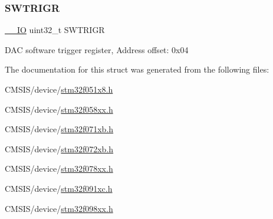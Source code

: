 \subsubsection{\texorpdfstring{S\+W\+T\+R\+I\+GR}{SWTRIGR}}
{\footnotesize\ttfamily \hyperlink{core__sc300_8h_aec43007d9998a0a0e01faede4133d6be}{\+\_\+\+\_\+\+IO} uint32\+\_\+t S\+W\+T\+R\+I\+GR}

D\+AC software trigger register, Address offset\+: 0x04 

The documentation for this struct was generated from the following files\+:\begin{DoxyCompactItemize}
\item 
C\+M\+S\+I\+S/device/\hyperlink{stm32f051x8_8h}{stm32f051x8.\+h}\item 
C\+M\+S\+I\+S/device/\hyperlink{stm32f058xx_8h}{stm32f058xx.\+h}\item 
C\+M\+S\+I\+S/device/\hyperlink{stm32f071xb_8h}{stm32f071xb.\+h}\item 
C\+M\+S\+I\+S/device/\hyperlink{stm32f072xb_8h}{stm32f072xb.\+h}\item 
C\+M\+S\+I\+S/device/\hyperlink{stm32f078xx_8h}{stm32f078xx.\+h}\item 
C\+M\+S\+I\+S/device/\hyperlink{stm32f091xc_8h}{stm32f091xc.\+h}\item 
C\+M\+S\+I\+S/device/\hyperlink{stm32f098xx_8h}{stm32f098xx.\+h}\end{DoxyCompactItemize}
